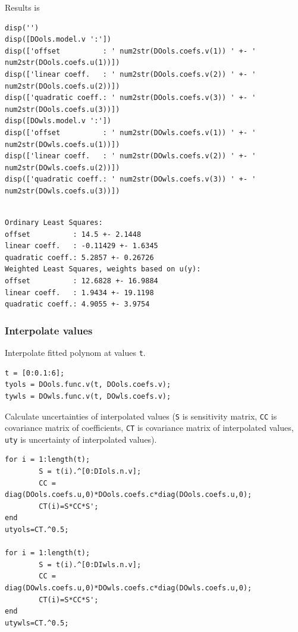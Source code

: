 Results is

\begin{lstlisting}
disp('')
disp([DOols.model.v ':'])
disp(['offset          : ' num2str(DOols.coefs.v(1)) ' +- ' num2str(DOols.coefs.u(1))])
disp(['linear coeff.   : ' num2str(DOols.coefs.v(2)) ' +- ' num2str(DOols.coefs.u(2))])
disp(['quadratic coeff.: ' num2str(DOols.coefs.v(3)) ' +- ' num2str(DOols.coefs.u(3))])
disp([DOwls.model.v ':'])
disp(['offset          : ' num2str(DOwls.coefs.v(1)) ' +- ' num2str(DOwls.coefs.u(1))])
disp(['linear coeff.   : ' num2str(DOwls.coefs.v(2)) ' +- ' num2str(DOwls.coefs.u(2))])
disp(['quadratic coeff.: ' num2str(DOwls.coefs.v(3)) ' +- ' num2str(DOwls.coefs.u(3))])
\end{lstlisting}
\begin{lstlisting}[language={},xleftmargin=5pt,frame=none]

Ordinary Least Squares:
offset          : 14.5 +- 2.1448
linear coeff.   : -0.11429 +- 1.6345
quadratic coeff.: 5.2857 +- 0.26726
Weighted Least Squares, weights based on u(y):
offset          : 12.6828 +- 16.9884
linear coeff.   : 1.9434 +- 19.1198
quadratic coeff.: 4.9055 +- 3.9754

\end{lstlisting}


{}
\subsubsection*{Interpolate values}



Interpolate fitted polynom at values \texttt{t}.

\begin{lstlisting}
t = [0:0.1:6];
tyols = DOols.func.v(t, DOols.coefs.v);
tywls = DOwls.func.v(t, DOwls.coefs.v);
\end{lstlisting}


Calculate uncertainties of interpolated values (\texttt{S} is sensitivity matrix, \texttt{CC} is covariance
matrix of coefficients, \texttt{CT} is covariance matrix of interpolated values, \texttt{uty} is uncertainty of
interpolated values).

\begin{lstlisting}
for i = 1:length(t);
        S = t(i).^[0:DIols.n.v];
        CC = diag(DOols.coefs.u,0)*DOols.coefs.c*diag(DOols.coefs.u,0);
        CT(i)=S*CC*S';
end
utyols=CT.^0.5;

for i = 1:length(t);
        S = t(i).^[0:DIwls.n.v];
        CC = diag(DOwls.coefs.u,0)*DOwls.coefs.c*diag(DOwls.coefs.u,0);
        CT(i)=S*CC*S';
end
utywls=CT.^0.5;
\end{lstlisting}


